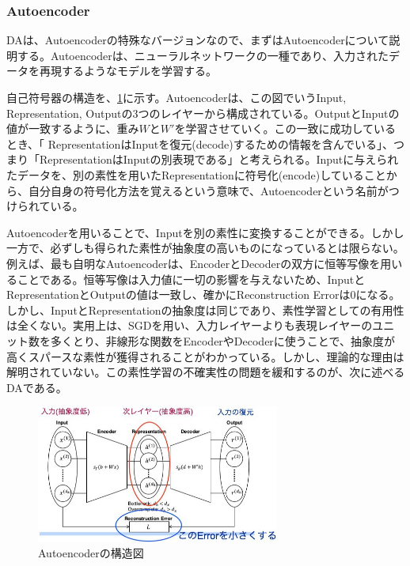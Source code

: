 \subsubsection{Autoencoder}
DAは、Autoencoderの特殊なバージョンなので、まずはAutoencoderについて説明する。Autoencoderは、ニューラルネットワークの一種であり、入力されたデータを再現するようなモデルを学習する。\cite{bourlard1988auto, hinton1994autoencoders, schwenk1995transformation}\par
自己符号器の構造を、\ref{c3_autoencoder}に示す。Autoencoderは、この図でいうInput, Representation, Outputの3つのレイヤーから構成されている。OutputとInputの値が一致するように、重み$W$と$W'$を学習させていく。この一致に成功しているとき、「
RepresentationはInputを復元(decode)するための情報を含んでいる」、つまり「RepresentationはInputの別表現である」と考えられる。Inputに与えられたデータを、別の素性を用いたRepresentationに符号化(encode)していることから、自分自身の符号化方法を覚えるという意味で、Autoencoderという名前がつけられている。\par
Autoencoderを用いることで、Inputを別の素性に変換することができる。しかし一方で、必ずしも得られた素性が抽象度の高いものになっているとは限らない。例えば、最も自明なAutoencoderは、EncoderとDecoderの双方に恒等写像を用いることである。恒等写像は入力値に一切の影響を与えないため、InputとRepresentationとOutputの値は一致し、確かにReconstruction Errorは0になる。しかし、InputとRepresentationの抽象度は同じであり、素性学習としての有用性は全くない。実用上は、SGDを用い、入力レイヤーよりも表現レイヤーのユニット数を多くとり、非線形な関数をEncoderやDecoderに使うことで、抽象度が高くスパースな素性が獲得されることがわかっている\cite{bengio2007greedy}\cite{lee2007sparse}。しかし、理論的な理由は解明されていない。この素性学習の不確実性の問題を緩和するのが、次に述べるDAである。
\begin{figure}[tbp]
 \begin{center}
  \includegraphics[width=80mm]{img/c3/autoencoder}
 \end{center}
 \caption{Autoencoderの構造図}
 \label{c3_autoencoder}
\end{figure}

